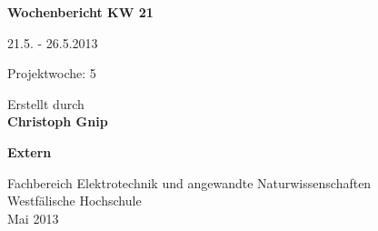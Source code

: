 
\begin{center}
{\Huge \textbf{Wochenbericht KW 21}\par}
\vspace{1cm}
{\Huge 21.5. - 26.5.2013\par}
\vspace{1cm}
{\Huge Projektwoche: 5\par}

\vspace{2cm}

\large{Erstellt durch}\\
\Large{\textbf{Christoph Gnip}}


\vspace{4cm}

\Large{\textbf{Extern}}

\vfill

{\normalsize Fachbereich Elektrotechnik und angewandte Naturwissenschaften\\
Westfälische Hochschule\\[2ex]Mai 2013}


\end{center}
\newpage